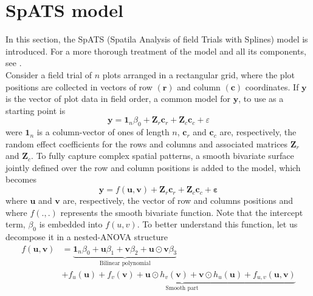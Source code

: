 \section{SpATS model}
\label{sec:spats_model}
In this section, the SpATS (Spatila Analysis of field Trials with Splines) model is introduced. For a more thorough treatment of the model and all its components, see \textcite{rodriguez-alvarez_spatial_2016}.\\
Consider a field trial of $n$ plots arranged in a rectangular grid, where the plot positions are collected in vectors of row $(\mathbf{r})$ and column $(\mathbf{c})$ coordinates. If $\mathbf{y}$ is the vector of plot data in field order, a common model for $\mathbf{y}$, to use as a starting point is
	\begin{equation}
	    \boldsymbol{y}=\mathbf{1}_{n} \beta_{0}+\boldsymbol{Z}_{r} \boldsymbol{c}_{r}+\boldsymbol{Z}_{c} \boldsymbol{c}_{c}
	    +\varepsilon
	\end{equation}
were $\mathbf{1}_{n}$ is a column-vector of ones of length $n$, $\boldsymbol{c}_{r}$ and $\boldsymbol{c}_{c}$ are, respectively, the random effect coefficients for the rows and columns and associated matrices $\boldsymbol{Z}_{r}$ and $\boldsymbol{Z}_{c}$. To fully capture complex spatial patterns, a smooth bivariate surface jointly defined over the row and column positions is added to the model, which becomes
	\begin{equation}
	    \boldsymbol{y}=f(\boldsymbol{u}, \boldsymbol{v})+\boldsymbol{Z}_{r} \boldsymbol{c}_{r}+\boldsymbol{Z}_{c} \boldsymbol{c}
	    _{c}+\boldsymbol{\varepsilon}
	    \label{eq:base_model_bismooth_surface}
	\end{equation}
where $\mathbf{u}$ and $\mathbf{v}$ are, respectively, the vector of row and columns positions and where $f(.,.)$ represents the smooth bivariate function. Note that the intercept term, $\beta_0$ is embedded into $f(u,v)$. To better understand this function, let us decompose it in a nested-ANOVA structure
	\begin{align}
	f ( \boldsymbol { u } , \boldsymbol { v } ) & = \underbrace { \mathbf { 1 } _ { n } \beta _ { 0 } + \boldsymbol { u } \beta
	 _ { 1 } + \boldsymbol { v } \beta _ { 2 } + \boldsymbol { u } \odot \boldsymbol { v } \beta _ { 3 } } _ { \text { Bilinear
	  polynomial } } \nonumber \\
	 & + \underbrace { f _ { u } ( \boldsymbol { u } ) + f _ { v } ( \boldsymbol { v } ) + \boldsymbol { u } \odot h _ { v } (
	  \boldsymbol { v } ) + \boldsymbol { v } \odot h _ { u } ( \boldsymbol { u } ) + f _ { u , v } ( \boldsymbol { u } ,
	   \boldsymbol { v } ) }_{\text{Smooth part}}
	 \label{eq:full_bivariate_smooth_surface_model}
	\end{align}

